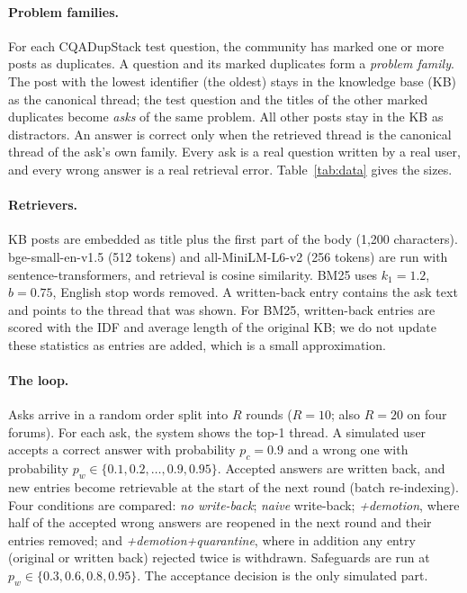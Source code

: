 \documentclass[11pt]{article}
\begin{document}
\paragraph{Problem families.} For each CQADupStack test question, the community has marked one or more posts as duplicates. A question and its marked duplicates form a \emph{problem family}. The post with the lowest identifier (the oldest) stays in the knowledge base (KB) as the canonical thread; the test question and the titles of the other marked duplicates become \emph{asks} of the same problem. All other posts stay in the KB as distractors. An answer is correct only when the retrieved thread is the canonical thread of the ask's own family. Every ask is a real question written by a real user, and every wrong answer is a real retrieval error. Table~\ref{tab:data} gives the sizes.

\begin{table}[t]\centering\small

\caption{The twelve CQADupStack forums as used here. ``Repeat asks'' are asks of a family beyond its first ask.}
\label{tab:data}
\end{table}

\paragraph{Retrievers.} KB posts are embedded as title plus the first part of the body (1{,}200 characters). bge-small-en-v1.5 (512 tokens) and all-MiniLM-L6-v2 (256 tokens) are run with sentence-transformers, and retrieval is cosine similarity. BM25 uses $k_1=1.2$, $b=0.75$, English stop words removed. A written-back entry contains the ask text and points to the thread that was shown. For BM25, written-back entries are scored with the IDF and average length of the original KB; we do not update these statistics as entries are added, which is a small approximation.

\paragraph{The loop.} Asks arrive in a random order split into $R$ rounds ($R=10$; also $R=20$ on four forums). For each ask, the system shows the top-1 thread. A simulated user accepts a correct answer with probability $p_c=0.9$ and a wrong one with probability $p_w\in\{0.1,0.2,\dots,0.9,0.95\}$. Accepted answers are written back, and new entries become retrievable at the start of the next round (batch re-indexing). Four conditions are compared: \emph{no write-back}; \emph{naive} write-back; \emph{+demotion}, where half of the accepted wrong answers are reopened in the next round and their entries removed; and \emph{+demotion+quarantine}, where in addition any entry (original or written back) rejected twice is withdrawn. Safeguards are run at $p_w\in\{0.3,0.6,0.8,0.95\}$. The acceptance decision is the only simulated part.
\end{document}

